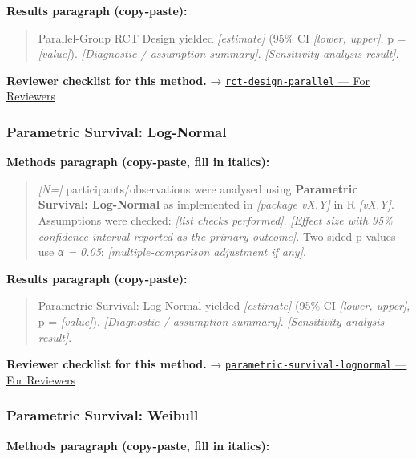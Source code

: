 \documentclass[
]{article}
\begin{document}
\textbf{Results paragraph (copy-paste):}

\begin{quote}
Parallel-Group RCT Design yielded \emph{{[}estimate{]}} (95\% CI
\emph{{[}lower, upper{]}}, p = \emph{{[}value{]}}). \emph{{[}Diagnostic
/ assumption summary{]}}. \emph{{[}Sensitivity analysis result{]}}.
\end{quote}

\textbf{Reviewer checklist for this method.} →
\href{../chapters/14-clinical/rct-design-parallel.Rmd\#for-reviewers}{\texttt{rct-design-parallel}
--- For Reviewers}

\subsubsection{Parametric Survival:
Log-Normal}\label{parametric-survival-log-normal}

\textbf{Methods paragraph (copy-paste, fill in italics):}

\begin{quote}
\emph{{[}N={]}} participants/observations were analysed using
\textbf{Parametric Survival: Log-Normal} as implemented in
\emph{{[}package vX.Y{]}} in R \emph{{[}vX.Y{]}}. Assumptions were
checked: \emph{{[}list checks performed{]}}. \emph{{[}Effect size with
95\% confidence interval reported as the primary outcome{]}}. Two-sided
p-values use \emph{α = 0.05}; \emph{{[}multiple-comparison adjustment if
any{]}}.
\end{quote}

\textbf{Results paragraph (copy-paste):}

\begin{quote}
Parametric Survival: Log-Normal yielded \emph{{[}estimate{]}} (95\% CI
\emph{{[}lower, upper{]}}, p = \emph{{[}value{]}}). \emph{{[}Diagnostic
/ assumption summary{]}}. \emph{{[}Sensitivity analysis result{]}}.
\end{quote}

\textbf{Reviewer checklist for this method.} →
\href{../chapters/11-survival/parametric-survival-lognormal.Rmd\#for-reviewers}{\texttt{parametric-survival-lognormal}
--- For Reviewers}

\subsubsection{Parametric Survival:
Weibull}\label{parametric-survival-weibull}

\textbf{Methods paragraph (copy-paste, fill in italics):}
\end{document}
